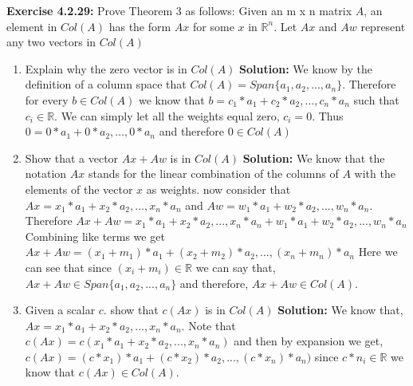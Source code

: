 \documentclass{amsart}
\def\RR{{\mathbb R}}
\begin{document}
\noindent\textbf{Exercise 4.2.29: } Prove Theorem 3 as follows: Given an m x n matrix $A$, an element in $Col(A)$ has the form $Ax$ for some $x$ in $\RR^n$. Let $Ax$ and $Aw$ represent any two vectors in $Col(A)$\\
\begin{enumerate}

\item Explain why the zero vector is in $Col(A)$
\noindent \textbf{Solution: } We know by the definition of a column space that $Col(A) = Span \{a_1,a_2,...,a_n\}$. Therefore for every $b \in Col(A)$ we know that $b =c_1*a_1+c_2*a_2,...,c_n*a_n$ such that $c_i \in \RR$. We can simply let all the weights equal zero, $c_i = 0$. Thus $0 =0*a_1+0*a_2,...,0*a_n$ and therefore  $0 \in Col(A)$
\vspace{1in}


\item Show that a vector $Ax+Aw$ is in $Col(A)$ 
\noindent \textbf{Solution: } We know that the notation $Ax$ stands for the linear combination of the columns of $A$ with the elements of the vector $x$ as weights. now consider that $Ax =x_1*a_1+x_2*a_2,...,x_n*a_n$ and $Aw = w_1*a_1+w_2*a_2,...,w_n*a_n$. Therefore $Ax + Aw = x_1*a_1+x_2*a_2,...,x_n*a_n +w_1*a_1+w_2*a_2,...,w_n*a_n$ Combining like terms we get $Ax + Aw = (x_1+m_1)*a_1+(x_2+m_2)*a_2,...,(x_n+m_n)*a_n$ Here we can see that since $(x_i+m_i) \in \RR$ we can say that, $Ax+Aw \in Span \{a_1,a_2,...,a_n\}$ and therefore, $Ax+Aw \in Col(A)$.
\vspace{1in}


\item Given a scalar $c$. show that $c(Ax)$ is in $Col(A)$
\noindent \textbf{Solution: } We know that, $Ax =x_1*a_1+x_2*a_2,...,x_n*a_n$. Note that $c(Ax) =c(x_1*a_1+x_2*a_2,...,x_n*a_n)$ and then by expansion we get,   $c(Ax) =(c*x_1)*a_1+(c*x_2)*a_2,...,(c*x_n)*a_n)$ since $c*n_i \in \RR $ we know that $c(Ax) \in Col(A)$.
\vspace{1in}


\end{enumerate}
\end{document}
